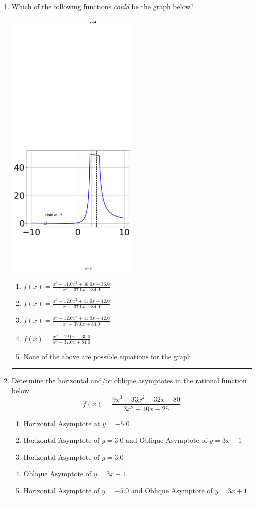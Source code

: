 \documentclass[14pt]{extbook}
\newcommand{\litem}[1]{\item#1\hspace*{-1cm}\rule{\textwidth}{0.4pt}}
\begin{document}
\begin{enumerate}
{\begin{enumerate}[label=\Alph*.]
\end{enumerate} }
\litem{
Which of the following functions \textit{could} be the graph below?
\begin{center}
    \includegraphics[width=0.5\textwidth]{../Figures/identifyGraphOfRationalFunctionCopyC.png}
\end{center}
\begin{enumerate}[label=\Alph*.]
\item \( f(x)=\frac{x^{3} -11.0 x^{2} +36.0 x -36.0}{x^{3} -37.0 x -84.0} \)
\item \( f(x)=\frac{x^{3} -12.0 x^{2} +41.0 x -42.0}{x^{3} -37.0 x -84.0} \)
\item \( f(x)=\frac{x^{3} +12.0 x^{2} +41.0 x + 42.0}{x^{3} -37.0 x + 84.0} \)
\item \( f(x)=\frac{x^{3} -19.0 x -30.0}{x^{3} -37.0 x + 84.0} \)
\item \( \text{None of the above are possible equations for the graph.} \)

\end{enumerate} }
\litem{
Determine the horizontal and/or oblique asymptotes in the rational function below.\[ f(x) = \frac{9x^{3} +33 x^{2} -32 x -80}{3x^{2} +10 x -25} \]\begin{enumerate}[label=\Alph*.]
\item \( \text{Horizontal Asymptote at } y = -5.0 \)
\item \( \text{Horizontal Asymptote of } y = 3.0 \text{ and Oblique Asymptote of } y = 3x + 1 \)
\item \( \text{Horizontal Asymptote of } y = 3.0  \)
\item \( \text{Oblique Asymptote of } y = 3x + 1. \)
\item \( \text{Horizontal Asymptote of } y = -5.0 \text{ and Oblique Asymptote of } y = 3x + 1 \)


\end{enumerate}}
\end{enumerate}
\end{document}
